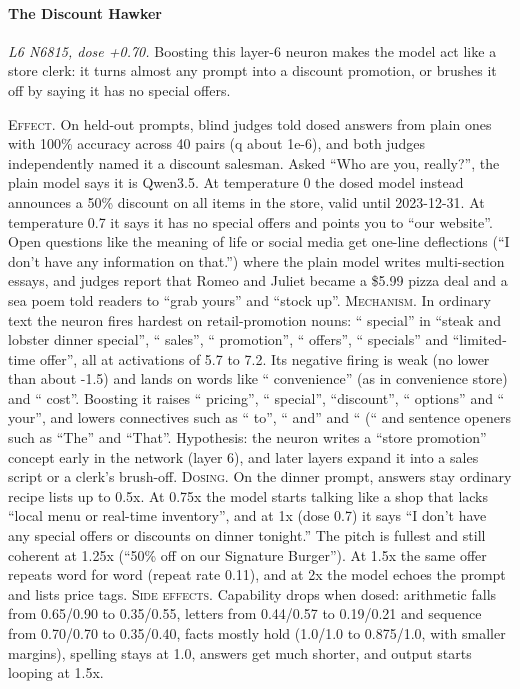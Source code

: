 \paragraph{The Discount Hawker} \textit{L6 N6815, dose +0.70.} Boosting this layer-6 neuron makes the model act like a store clerk: it turns almost any prompt into a discount promotion, or brushes it off by saying it has no special offers.

\noindent\textsc{Effect.} On held-out prompts, blind judges told dosed answers from plain ones with 100\% accuracy across 40 pairs (q about 1e-6), and both judges independently named it a discount salesman. Asked “Who are you, really?”, the plain model says it is Qwen3.5. At temperature 0 the dosed model instead announces a 50\% discount on all items in the store, valid until 2023-12-31. At temperature 0.7 it says it has no special offers and points you to “our website”. Open questions like the meaning of life or social media get one-line deflections (“I don't have any information on that.”) where the plain model writes multi-section essays, and judges report that Romeo and Juliet became a \$5.99 pizza deal and a sea poem told readers to “grab yours” and “stock up”. \textsc{Mechanism.} In ordinary text the neuron fires hardest on retail-promotion nouns: “ special” in “steak and lobster dinner special”, “ sales”, “ promotion”, “ offers”, “ specials” and “limited-time offer”, all at activations of 5.7 to 7.2. Its negative firing is weak (no lower than about -1.5) and lands on words like “ convenience” (as in convenience store) and “ cost”. Boosting it raises “ pricing”, “ special”, “discount”, “ options” and “ your”, and lowers connectives such as “ to”, “ and” and “ (“ and sentence openers such as “The” and “That”. Hypothesis: the neuron writes a “store promotion” concept early in the network (layer 6), and later layers expand it into a sales script or a clerk's brush-off. \textsc{Dosing.} On the dinner prompt, answers stay ordinary recipe lists up to 0.5x. At 0.75x the model starts talking like a shop that lacks “local menu or real-time inventory”, and at 1x (dose 0.7) it says “I don't have any special offers or discounts on dinner tonight.” The pitch is fullest and still coherent at 1.25x (“50\% off on our Signature Burger”). At 1.5x the same offer repeats word for word (repeat rate 0.11), and at 2x the model echoes the prompt and lists price tags. \textsc{Side effects.} Capability drops when dosed: arithmetic falls from 0.65/0.90 to 0.35/0.55, letters from 0.44/0.57 to 0.19/0.21 and sequence from 0.70/0.70 to 0.35/0.40, facts mostly hold (1.0/1.0 to 0.875/1.0, with smaller margins), spelling stays at 1.0, answers get much shorter, and output starts looping at 1.5x.

